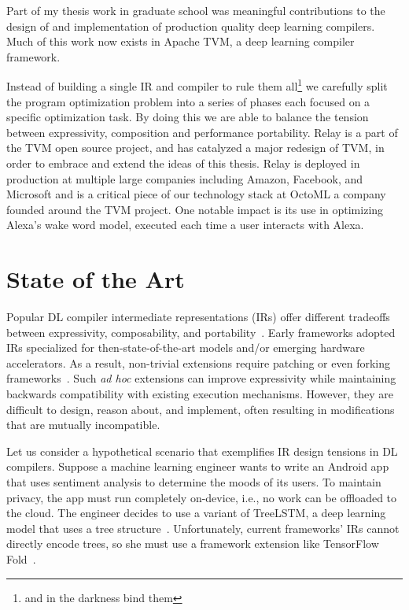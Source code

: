  Part of my thesis work in graduate school
  was meaningful contributions to the design of and implementation of
  production quality deep learning compilers.
Much of this work now exists in Apache TVM, a deep learning compiler framework.

Instead of building a single IR and compiler to rule them all\footnote{and in the darkness bind them}
  we carefully split the program optimization problem into a series of
  phases each focused on a specific optimization task.
By doing this we are able to balance the tension between expressivity, composition
  and performance portability.
Relay is a part of the TVM open source project, and has catalyzed a major redesign of
  TVM, in order to embrace and extend the ideas of this thesis.
Relay is deployed in production at multiple large companies including
  Amazon, Facebook, and Microsoft and is a critical piece of our technology stack
  at OctoML a company founded around the TVM project.
One notable impact is its use in
  optimizing Alexa’s wake word model, executed each time a user interacts with
  Alexa.

\section{State of the Art}

Popular DL compiler intermediate representations (IRs) offer different tradeoffs
  between expressivity, composability, and portability~\citep{
    tensorflow, pytorch_ad, chainer_learningsys2015, tangent, theano, glow}.
Early frameworks adopted IRs
  specialized for then-state-of-the-art models and/or
  emerging hardware accelerators.
As a result, non-trivial extensions require
  patching or even forking frameworks~\citep{
    tf_fold, tf_lite, tangent, tf_eager, xla, glow, torchscript}.
Such \textit{ad hoc} extensions can improve expressivity
  while maintaining backwards compatibility with existing execution mechanisms.
However, they are difficult to design, reason about, and implement,
  often resulting in modifications that are mutually incompatible.

Let us consider a hypothetical scenario that exemplifies
  IR design tensions in DL compilers.
Suppose a machine learning engineer wants to write
  an Android app that uses sentiment analysis to
  determine the moods of its users.
To maintain privacy, the app must run completely on-device,
  i.e., no work can be offloaded to the cloud.
The engineer decides to use a variant of TreeLSTM,
  a deep learning model that uses a tree structure~\citep{tree_lstm}.
Unfortunately, current frameworks' IRs cannot directly encode trees,
  so she must use a framework extension
  like TensorFlow Fold~\citep{tensorflowfold}.

